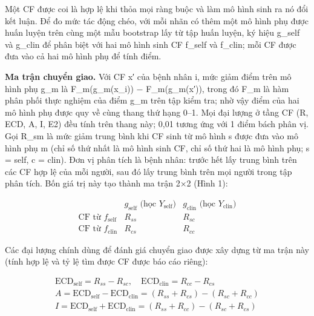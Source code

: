 \documentclass[9pt,a4paper]{extarticle}
\begin{document}
Một CF được coi là hợp lệ khi thỏa mọi ràng buộc và làm mô hình sinh ra
nó đổi kết luận. Để đo mức tác động chéo, với mỗi nhãn có thêm một mô
hình phụ được huấn luyện trên cùng một mẫu bootstrap lấy từ tập huấn
luyện, ký hiệu g\_self và g\_clin để phân biệt với hai mô hình sinh CF
f\_self và f\_clin; mỗi CF được đưa vào cả hai mô hình phụ để tính điểm.

\textbf{Ma trận chuyển giao.} Với CF x′ của bệnh nhân i, mức giảm điểm
trên mô hình phụ g\_m là F\_m(g\_m(x\_i)) − F\_m(g\_m(x′)), trong đó
F\_m là hàm phân phối thực nghiệm của điểm g\_m trên tập kiểm tra; nhờ
vậy điểm của hai mô hình phụ được quy về cùng thang thứ hạng 0--1. Mọi
đại lượng ở tầng CF (R, ECD, A, I, E2) đều tính trên thang này; 0,01
tương ứng với 1 điểm bách phân vị. Gọi R\_sm là mức giảm trung bình khi
CF sinh từ mô hình s được đưa vào mô hình phụ m (chỉ số thứ nhất là mô
hình sinh CF, chỉ số thứ hai là mô hình phụ; s = self, c = clin). Đơn vị
phân tích là bệnh nhân: trước hết lấy trung bình trên các CF hợp lệ của
mỗi người, sau đó lấy trung bình trên mọi người trong tập phân tích. Bốn
giá trị này tạo thành ma trận 2×2 (Hình 1):

\[
\begin{array}{l|cc}
 & g_{\mathrm{self}} \text{ (học } Y_{\mathrm{self}}) & g_{\mathrm{clin}} \text{ (học } Y_{\mathrm{clin}}) \\ \hline
\text{CF từ } f_{\mathrm{self}} & R_{ss} & R_{sc} \\
\text{CF từ } f_{\mathrm{clin}} & R_{cs} & R_{cc}
\end{array}
\]

Các đại lượng chính dùng để đánh giá chuyển giao được xây dựng từ ma
trận này (tính hợp lệ và tỷ lệ tìm được CF được báo cáo riêng):

\begin{gather*}
\mathrm{ECD}_{\mathrm{self}} = R_{ss} - R_{sc}, \quad \mathrm{ECD}_{\mathrm{clin}} = R_{cc} - R_{cs} \\[3pt]
A = \mathrm{ECD}_{\mathrm{self}} - \mathrm{ECD}_{\mathrm{clin}} = (R_{ss} + R_{cs}) - (R_{sc} + R_{cc}) \\[3pt]
I = \mathrm{ECD}_{\mathrm{self}} + \mathrm{ECD}_{\mathrm{clin}} = (R_{ss} + R_{cc}) - (R_{sc} + R_{cs})
\end{gather*}
\end{document}
